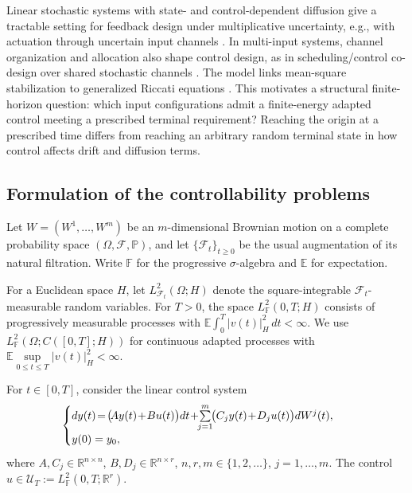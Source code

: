 \documentclass[twocolumn]{autart}
\begin{document}
Linear stochastic systems with state- and control-dependent diffusion give a tractable setting for feedback design under multiplicative uncertainty, e.g., with actuation through uncertain input channels \cite{NandanooriDiwadkarVaidya2018}. In multi-input systems, channel organization and allocation also shape control design, as in scheduling/control co-design over shared stochastic channels \cite{ChenYaoQiu2019}. The model links mean-square stabilization to generalized Riccati equations \cite{ZhangChen2004}. This motivates a structural finite-horizon question: which input configurations admit a finite-energy adapted control meeting a prescribed terminal requirement? Reaching the origin at a prescribed time differs from reaching an arbitrary random terminal state in how control affects drift and diffusion terms.



\subsection{Formulation of the controllability problems}

Let $W=(W^1,\dots,W^m)$ be an $m$-dimensional Brownian motion on a
complete probability space $(\Omega,\mathcal F,\mathbb P)$, and let
$\{\mathcal F_t\}_{t\geq0}$ be the usual augmentation of its natural
filtration. Write $\mathbb F$ for the progressive $\sigma$-algebra and
$\mathbb E$ for expectation.

For a Euclidean space $H$, let $L^2_{\mathcal F_t}(\Omega;H)$ denote
the square-integrable $\mathcal F_t$-measurable random variables.
For $T>0$, the space $L^2_{\mathbb F}(0,T;H)$ consists of progressively
measurable processes with $\mathbb E\int_0^T|v(t)|_H^2\,dt<\infty$.
We use $L^2_{\mathbb F}(\Omega;C([0,T];H))$ for continuous adapted
processes with $\mathbb E\sup\limits_{0\leq t\leq T}|v(t)|_H^2<\infty$.

For $t\in[0,T]$, consider the linear control system\vspace{-2mm}
\begin{equation}\label{eq:system}
\!\!\!\begin{cases}
dy(t) \!=\!\big(\!Ay(t)\!+\!Bu(t)\big) dt \!+\!\!\sum\limits_{j=1}^m\!\!\big(C_jy(t)\!+\!D_ju(t)\big) dW^j(t),\\[2pt]
y(0) =y_0, 
\end{cases}\vspace{-1mm}
\end{equation}
%
where $A,C_j\in\mathbb R^{n\times n}$,
$B,D_j\in\mathbb R^{n\times r}$, $n,r,m\in\{1,2,\dots\}$, $j=1,\dots,m$. The control
$u\in\mathcal U_T:=L^2_{\mathbb F}(0,T;\mathbb R^r)$.
\end{document}
